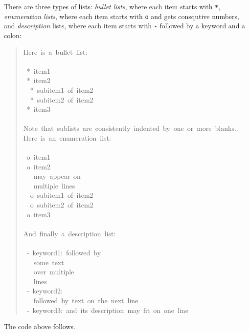 \documentclass[a4paper]{article}
\begin{document}
There are three types of lists: \emph{bullet lists}, where each item starts
with \texttt{*}, \emph{enumeration lists}, where each item starts with \texttt{o} and gets
consqutive numbers,
and \emph{description} lists, where each item starts with \texttt{-} followed
by a keyword and a colon:
%
\begin{quote}{\ttfamily \raggedright \noindent
Here~is~a~bullet~list:\\
~\\
~*~item1\\
~*~item2\\
~~*~subitem1~of~item2\\
~~*~subitem2~of~item2\\
~*~item3\\
~\\
Note~that~sublists~are~consistently~indented~by~one~or~more~blanks..\\
Here~is~an~enumeration~list:\\
~\\
~o~item1\\
~o~item2\\
~~~may~appear~on\\
~~~multiple~lines\\
~~o~subitem1~of~item2\\
~~o~subitem2~of~item2\\
~o~item3\\
~\\
And~finally~a~description~list:\\
~\\
~-~keyword1:~followed~by\\
~~~some~text\\
~~~over~multiple\\
~~~lines\\
~-~keyword2:\\
~~~followed~by~text~on~the~next~line\\
~-~keyword3:~and~its~description~may~fit~on~one~line
}
\end{quote}

The code above follows.
\end{document}
